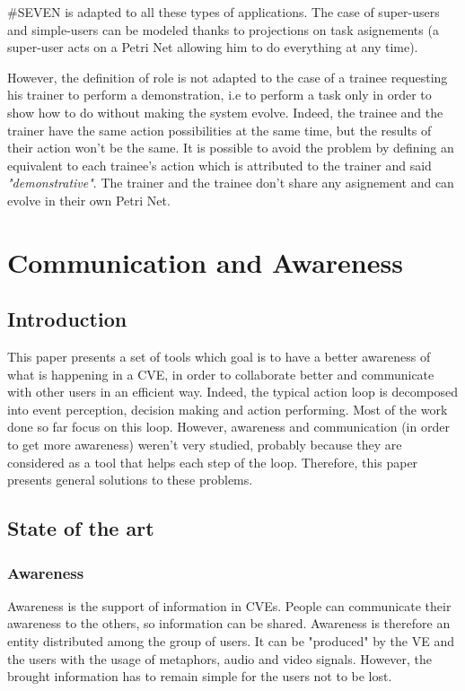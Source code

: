 \documentclass[a4paper]{article}
\begin{document}
\#SEVEN is adapted to all these types of applications. The case of super-users and simple-users can be modeled thanks to projections on task asignements (a super-user acts on a Petri Net allowing him to do everything at any time).

However, the definition of role is not adapted to the case of a trainee requesting his trainer to perform a demonstration, i.e to perform a task only in order to show how to do without making the system evolve. Indeed, the trainee and the trainer have the same action possibilities at the same time, but the results of their action won't be the same. It is possible to avoid the problem by defining an equivalent to each trainee's action which is attributed to the trainer and said \textit{"demonstrative"}. The trainer and the trainee don't share any asignement and can evolve in their own Petri Net.

\section{Communication and Awareness}

\subsection{Introduction}
This paper presents a set of tools which goal is to have a better awareness of what is happening in a CVE, in order to collaborate better and communicate with other users in an efficient way. Indeed, the typical action loop is decomposed into event perception, decision making and action performing. Most of the work done so far focus on this loop. However, awareness and communication (in order to get more awareness) weren't very studied, probably because they are considered as a tool that helps each step of the loop. Therefore, this paper presents general solutions to these problems.

\subsection{State of the art}

\subsubsection{Awareness}
Awareness is the support of information in CVEs. People can communicate their awareness to the others, so information can be shared. Awareness is therefore an entity distributed among the group of users. It can be "produced" by the VE and the users with the usage of metaphors, audio and video signals. However, the brought information has to remain simple for the users not to be lost.
\end{document}
